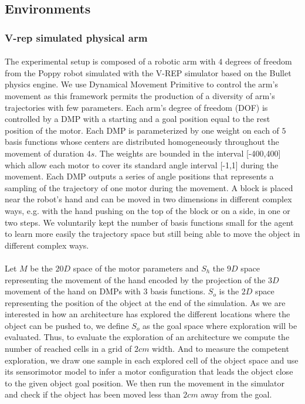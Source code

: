 \documentclass[12pt]{article}
\begin{document}
	
	\subsection{Environments}

		\subsubsection{V-rep simulated physical arm}
			
			\paragraph{}
			The experimental setup is composed of a robotic arm with $4$ degrees of freedom from the Poppy robot \cite{poppy} simulated with the V-REP simulator 
			based on the Bullet physics engine. 
			We use Dynamical Movement Primitive \cite{ijspeert_dynamical_2013} to control the arm's movement as this framework permits the production of a diversity of arm's trajectories with few parameters.
			Each arm's degree of freedom (DOF) is controlled by a DMP with a starting and a goal position equal to the rest position of the motor.
			Each DMP is parameterized by one weight on each of $5$ basis functions whose centers are distributed homogeneously throughout the movement of duration $4s$.
			The weights are bounded in the interval [-400,400] which allow each motor to cover its standard angle interval [-1,1] during the movement.
			Each DMP outputs a series of angle positions that represents a sampling of the trajectory of one motor during the movement.
			A block is placed near the robot's hand and can be moved in two dimensions in different complex ways, e.g. with the hand pushing on the top of the block or on a side, in one or two steps.
			We voluntarily kept the number of basis functions small for the agent to learn more easily the trajectory space but still being able to move the object in different complex ways. 

			
			\paragraph{}
			Let $M$ be the $20D$ space of the motor parameters and $S_h$ the $9D$ space representing the movement of the hand encoded by the projection of the $3D$ movement of the hand on DMPs with $3$ basis functions. 
			$S_o$ is the $2D$ space representing the position of the object at the end of the simulation.
			As we are interested in how an architecture has explored the different locations where the object can be pushed to, we define $S_o$ as the goal space where exploration will be evaluated.
			Thus, to evaluate the exploration of an architecture we compute the number of reached cells in a grid of $2cm$ width.
			And to measure the competent exploration, we draw one sample in each explored cell of the object space and use its sensorimotor model to infer a motor configuration that leads the object close to the given object goal position. We then run the movement in the simulator and check if the object has been moved less than $2cm$ away from the goal.
					
\end{document}
